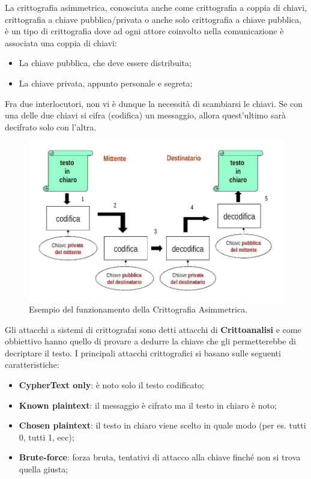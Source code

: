 La crittografia asimmetrica, conosciuta anche come crittografia a coppia di chiavi,
crittografia a
chiave pubblica/privata o anche solo crittografia a chiave pubblica, è un tipo
di crittografia dove ad
ogni attore coinvolto nella comunicazione è associata una coppia di chiavi:

\begin{itemize}
    \item La chiave pubblica, che deve essere distribuita;
    \item La chiave privata, appunto personale e segreta;
\end{itemize}

Fra due interlocutori, non vi è dunque la necessità di scambiarsi le chiavi.
Se con una delle due
chiavi si cifra (codifica) un messaggio, allora quest'ultimo sarà decifrato solo
con l'altra.

\begin{figure}[H]
    \centering
    \includegraphics[width=\textwidth, keepaspectratio]{capitoli/crittografia/imgs/pubblica.png}
    \caption{Esempio del funzionamento della Crittografia Asimmetrica.}
\end{figure}

Gli attacchi a sistemi di crittografai sono detti attacchi
di \textbf{Crittoanalisi} e
come obbiettivo hanno quello di provare a dedurre la chiave che gli
permetterebbe di decriptare il testo.
I principali attacchi crittografici si basano sulle seguenti caratteristiche:

\begin{itemize}
    \item \textbf{CypherText only}: è noto solo il testo codificato;
    \item \textbf{Known plaintext}: il messaggio è cifrato ma il testo in chiaro è noto;
    \item \textbf{Chosen plaintext}: il testo in chiaro viene scelto in quale modo (per es. tutti 0, tutti 1, ecc);
    \item \textbf{Brute-force}: forza bruta, tentativi di attacco alla chiave finché non si trova quella giusta;
\end{itemize}

